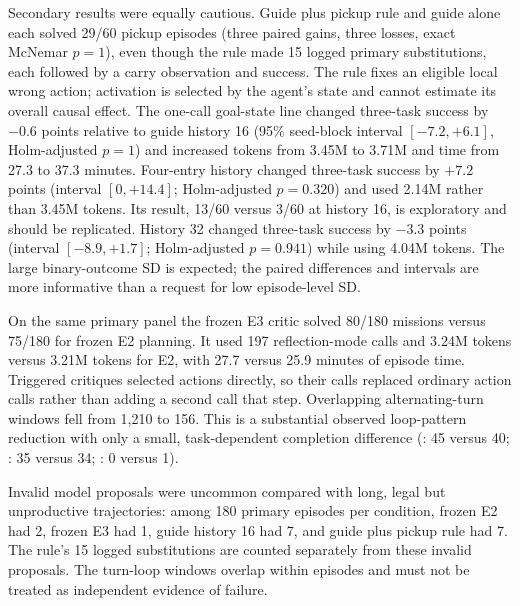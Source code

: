 \documentclass[11pt,a4paper]{article}
\newcommand{\BabyAI}{\textsc{BabyAI}}
\begin{document}
Secondary results were equally cautious. Guide plus pickup rule and guide alone each solved 29/60 pickup episodes (three paired gains, three losses, exact McNemar $p=1$), even though the rule made 15 logged primary substitutions, each followed by a carry observation and success. The rule fixes an eligible local wrong action; activation is selected by the agent's state and cannot estimate its overall causal effect. The one-call goal-state line changed three-task success by $-0.6$ points relative to guide history 16 (95\% seed-block interval $[-7.2,+6.1]$, Holm-adjusted $p=1$) and increased tokens from 3.45M to 3.71M and time from 27.3 to 37.3 minutes. Four-entry history changed three-task success by $+7.2$ points (interval $[0,+14.4]$; Holm-adjusted $p=0.320$) and used 2.14M rather than 3.45M tokens. Its  result, 13/60 versus 3/60 at history 16, is exploratory and should be replicated. History 32 changed three-task success by $-3.3$ points (interval $[-8.9,+1.7]$; Holm-adjusted $p=0.941$) while using 4.04M tokens. The large binary-outcome SD is expected; the paired differences and intervals are more informative than a request for low episode-level SD.

On the same primary panel the frozen E3 critic solved 80/180 missions versus 75/180 for frozen E2 planning. It used 197 reflection-mode calls and 3.24M tokens versus 3.21M tokens for E2, with 27.7 versus 25.9 minutes of episode time. Triggered critiques selected actions directly, so their calls replaced ordinary action calls rather than adding a second call that step. Overlapping alternating-turn windows fell from 1,210 to 156. This is a substantial observed loop-pattern reduction with only a small, task-dependent completion difference (: 45 versus 40; : 35 versus 34; : 0 versus 1).

Invalid model proposals were uncommon compared with long, legal but unproductive trajectories: among 180 primary episodes per condition, frozen E2 had 2, frozen E3 had 1, guide history 16 had 7, and guide plus pickup rule had 7. The rule's 15 logged substitutions are counted separately from these invalid proposals. The turn-loop windows overlap within episodes and must not be treated as independent evidence of failure.

\begin{table}[htbp]
\centering
\caption{Broader \BabyAI{} transfer: 12 new seeds per task, at most 128 actions. Entries are successes out of 12.}
\label{tab:broad}
\small
{}
\end{table}
\end{document}
